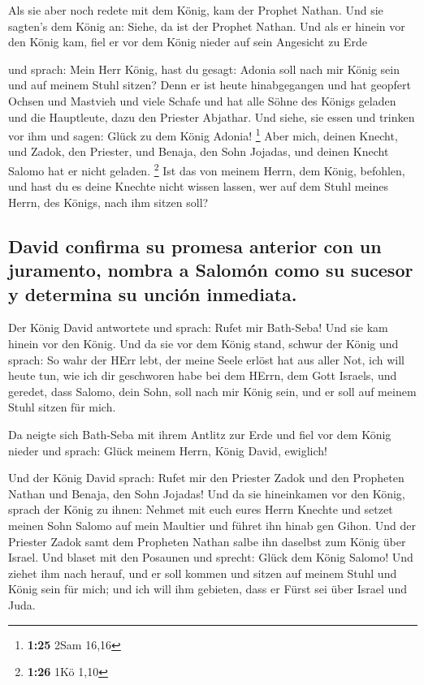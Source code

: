  Als sie aber noch redete mit dem König, kam der Prophet
Nathan.  Und sie sagten's dem König an: Siehe, da ist der
Prophet Nathan. Und als er hinein vor den König kam, fiel er vor dem
König nieder auf sein Angesicht zu Erde

 und sprach: Mein Herr König, hast du gesagt: Adonia soll
nach mir König sein und auf meinem Stuhl sitzen?  Denn er
ist heute hinabgegangen und hat geopfert Ochsen und Mastvieh und viele
Schafe und hat alle Söhne des Königs geladen und die Hauptleute, dazu
den Priester Abjathar. Und siehe, sie essen und trinken vor ihm und
sagen: Glück zu dem König Adonia! \footnote{\textbf{1:25} 2Sam 16,16}
 Aber mich, deinen Knecht, und Zadok, den Priester, und
Benaja, den Sohn Jojadas, und deinen Knecht Salomo hat er nicht geladen.
\footnote{\textbf{1:26} 1Kö 1,10}  Ist das von meinem
Herrn, dem König, befohlen, und hast du es deine Knechte nicht wissen
lassen, wer auf dem Stuhl meines Herrn, des Königs, nach ihm sitzen
soll?

\hypertarget{david-confirma-su-promesa-anterior-con-un-juramento-nombra-a-salomuxf3n-como-su-sucesor-y-determina-su-unciuxf3n-inmediata.}{%
\subsection{David confirma su promesa anterior con un juramento, nombra
a Salomón como su sucesor y determina su unción
inmediata.}\label{david-confirma-su-promesa-anterior-con-un-juramento-nombra-a-salomuxf3n-como-su-sucesor-y-determina-su-unciuxf3n-inmediata.}}

 Der König David antwortete und sprach: Rufet mir
Bath-Seba! Und sie kam hinein vor den König. Und da sie vor dem König
stand,  schwur der König und sprach: So wahr der HErr
lebt, der meine Seele erlöst hat aus aller Not,  ich will
heute tun, wie ich dir geschworen habe bei dem HErrn, dem Gott Israels,
und geredet, dass Salomo, dein Sohn, soll nach mir König sein, und er
soll auf meinem Stuhl sitzen für mich.

 Da neigte sich Bath-Seba mit ihrem Antlitz zur Erde und
fiel vor dem König nieder und sprach: Glück meinem Herrn, König David,
ewiglich!

 Und der König David sprach: Rufet mir den Priester Zadok
und den Propheten Nathan und Benaja, den Sohn Jojadas! Und da sie
hineinkamen vor den König,  sprach der König zu ihnen:
Nehmet mit euch eures Herrn Knechte und setzet meinen Sohn Salomo auf
mein Maultier und führet ihn hinab gen Gihon.  Und der
Priester Zadok samt dem Propheten Nathan salbe ihn daselbst zum König
über Israel. Und blaset mit den Posaunen und sprecht: Glück dem König
Salomo!  Und ziehet ihm nach herauf, und er soll kommen
und sitzen auf meinem Stuhl und König sein für mich; und ich will ihm
gebieten, dass er Fürst sei über Israel und Juda.

